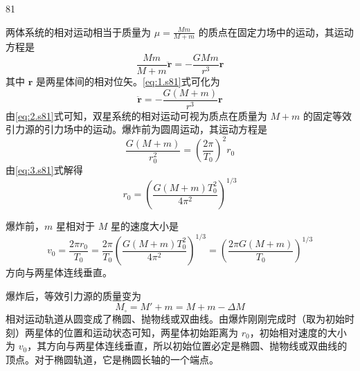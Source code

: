 \begin{solution}{81}
    \begin{subsolution}
        \begin{subsubsolution}
            两体系统的相对运动相当于质量为 $\mu = \frac{Mm}{M+m}$ 的质点在固定力场中的运动，其运动方程是
            \begin{equation}
                \frac{M m}{M+m} \ddot{\boldsymbol{r}} = - \frac{G M m}{r^{3}} \boldsymbol{r}
                \label{eq:1.s81}
            \end{equation}
            其中 $\boldsymbol{r}$ 是两星体间的相对位矢。\eqref{eq:1.s81}式可化为
            \begin{equation}
                \ddot{\boldsymbol{r}} = - \frac{G (M+m)}{r^{3}} \boldsymbol{r}
                \label{eq:2.s81}
            \end{equation}
            由\eqref{eq:2.s81}式可知，双星系统的相对运动可视为质点在质量为 $M+m$ 的固定等效引力源的引力场中的运动。爆炸前为圆周运动，其运动方程是
            \begin{equation}
                \frac{G (M+m)}{r_{0}^{2}} = \left(\frac{2\pi}{T_{0}}\right)^{2} r_{0}
                \label{eq:3.s81}
            \end{equation}
            由\eqref{eq:3.s81}式解得
            \begin{equation}
                r_{0} = \left(\frac{G (M+m) T_{0}^{2}}{4\pi^{2}}\right)^{1/3}
                \label{eq:4.s81}
            \end{equation}
        \end{subsubsolution}
        \begin{subsubsolution}
            爆炸前，$m$ 星相对于 $M$ 星的速度大小是
            \begin{equation}
                v_{0} = \frac{2\pi r_{0}}{T_{0}} = \frac{2\pi}{T_{0}} \left(\frac{G (M+m) T_{0}^{2}}{4\pi^{2}}\right)^{1/3} = \left(\frac{2\pi G (M+m)}{T_{0}}\right)^{1/3}
                \label{eq:5.s81}
            \end{equation}
            方向与两星体连线垂直。

            爆炸后，等效引力源的质量变为
            \begin{equation}
                M_{\square} = M' + m = M + m - \Delta M
                \label{eq:6.s81}
            \end{equation}
            相对运动轨道从圆变成了椭圆、抛物线或双曲线。由爆炸刚刚完成时（取为初始时刻）两星体的位置和运动状态可知，两星体初始距离为 $r_{0}$，初始相对速度的大小为 $v_{0}$，其方向与两星体连线垂直，所以初始位置必定是椭圆、抛物线或双曲线的顶点。对于椭圆轨道，它是椭圆长轴的一个端点。


\end{subsubsolution}
\end{subsolution}
\end{solution}
